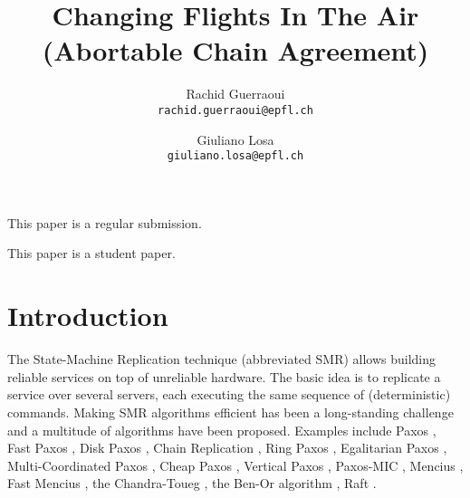 




\title{Changing Flights In The Air\\ (Abortable Chain Agreement)}

\author{
  Rachid Guerraoui\\
  \texttt{rachid.guerraoui@epfl.ch}
  \and
  Giuliano Losa\\
  \texttt{giuliano.losa@epfl.ch}
}

\date{}



\maketitle



\vspace{2cm}

\begin{center}
This paper is a regular submission.

\vspace{1cm}
This paper is a student paper.
\end{center}

\newpage

\section{Introduction}

The State-Machine Replication technique (abbreviated SMR) allows
building reliable services on top of unreliable hardware. The basic idea is to 
replicate a service over several servers, each executing the same
sequence of (deterministic) commands. 
Making SMR algorithms efficient has been a long-standing
challenge and a multitude of algorithms have been proposed. Examples
include Paxos \cite{lamport2001paxos}, Fast Paxos \cite{Lamport06FastPaxos}, Disk Paxos
\cite{GafniLamport03DiskPaxos}, Chain Replication
\cite{RenesseSchneider04ChainReplicationSupportingHighThroughputAvailability},
Ring Paxos
\cite{MarandiETAL10RingPaxosHighthroughputAtomicBroadcastProtocol},
Egalitarian Paxos
\cite{MoraruAndersenKaminsky13ThereIsMoreConsensusEgalitarianParliaments},
Multi-Coordinated Paxos
\cite{CamargosSchmidtPedone07MulticoordinatedPaxos}, Cheap Paxos
\cite{LamportMassa04CheapPaxos}, Vertical Paxos
\cite{LamportMalkhiZhou09VerticalPaxosPrimarybackupReplication},
Paxos-MIC
\cite{HurfinMoiseNarzul11AdaptiveFastPaxosMakingQuickEverlasting},
Mencius
\cite{MaoJunqueiraMarzullo08MenciusBuildingEfficientReplicatedStateMachine},
Fast Mencius \cite{WeiETAL13FastMenciusMenciusLowCommitLatency}, the Chandra-Toueg \cite{ChandraToueg96UnreliableFailureDetectorsReliableDistributedSystems}, the Ben-Or algorithm \cite{BenOr83AnotherAdvantageFreeChoiceCompletelyAsynchronous}, Raft \cite{OngaroOusterhout14SearchUnderstandableConsensusAlgorithm}.

